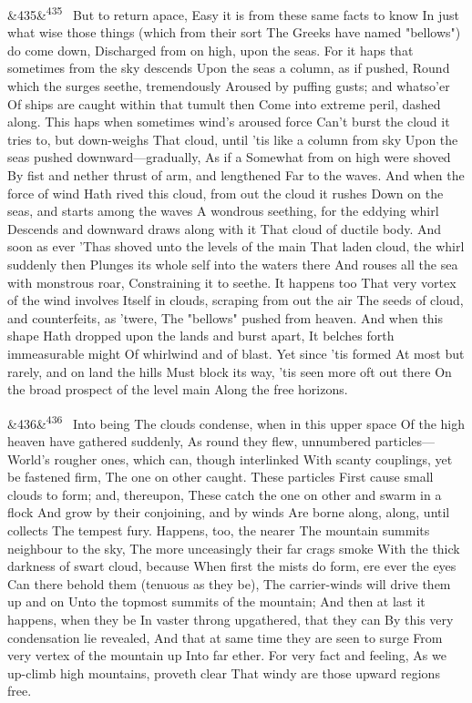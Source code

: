 \documentclass[12pt]{article}
\newcommand{\para}[1][]{\par\noindent\ifx&#1&\else\textsuperscript{\footnotesize #1}~\fi}
\begin{document}
\para[435] But to return apace, Easy it is from these same facts to know In just what wise those things (which from their sort The Greeks have named "bellows") do come down, Discharged from on high, upon the seas. For it haps that sometimes from the sky descends Upon the seas a column, as if pushed, Round which the surges seethe, tremendously Aroused by puffing gusts; and whatso'er Of ships are caught within that tumult then Come into extreme peril, dashed along. This haps when sometimes wind's aroused force Can't burst the cloud it tries to, but down-weighs That cloud, until 'tis like a column from sky Upon the seas pushed downward---gradually, As if a Somewhat from on high were shoved By fist and nether thrust of arm, and lengthened Far to the waves. And when the force of wind Hath rived this cloud, from out the cloud it rushes Down on the seas, and starts among the waves A wondrous seething, for the eddying whirl Descends and downward draws along with it That cloud of ductile body. And soon as ever 'Thas shoved unto the levels of the main That laden cloud, the whirl suddenly then Plunges its whole self into the waters there And rouses all the sea with monstrous roar, Constraining it to seethe. It happens too That very vortex of the wind involves Itself in clouds, scraping from out the air The seeds of cloud, and counterfeits, as 'twere, The "bellows" pushed from heaven. And when this shape Hath dropped upon the lands and burst apart, It belches forth immeasurable might Of whirlwind and of blast. Yet since 'tis formed At most but rarely, and on land the hills Must block its way, 'tis seen more oft out there On the broad prospect of the level main Along the free horizons.

\para[436] Into being The clouds condense, when in this upper space Of the high heaven have gathered suddenly, As round they flew, unnumbered particles--- World's rougher ones, which can, though interlinked With scanty couplings, yet be fastened firm, The one on other caught. These particles First cause small clouds to form; and, thereupon, These catch the one on other and swarm in a flock And grow by their conjoining, and by winds Are borne along, along, until collects The tempest fury. Happens, too, the nearer The mountain summits neighbour to the sky, The more unceasingly their far crags smoke With the thick darkness of swart cloud, because When first the mists do form, ere ever the eyes Can there behold them (tenuous as they be), The carrier-winds will drive them up and on Unto the topmost summits of the mountain; And then at last it happens, when they be In vaster throng upgathered, that they can By this very condensation lie revealed, And that at same time they are seen to surge From very vertex of the mountain up Into far ether. For very fact and feeling, As we up-climb high mountains, proveth clear That windy are those upward regions free.
\end{document}
